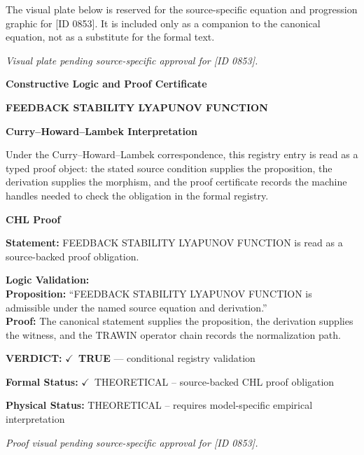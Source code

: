 \begingroup\footnotesize\sloppy
The visual plate below is reserved for the source-specific equation and progression graphic for [ID 0853]. It is included only as a companion to the canonical equation, not as a substitute for the formal text.
\par\endgroup
\begingroup\footnotesize\itshape
Visual plate pending source-specific approval for [ID 0853].
\par\endgroup

\clearpage
\begingroup\tzpsupportsetup
\noindent\textbf{\fontsize{10.8pt}{12.8pt}\selectfont [ID 0853] Constructive Logic and Proof Certificate}\par
\noindent\textbf{\fontsize{10pt}{12pt}\selectfont FEEDBACK STABILITY LYAPUNOV FUNCTION}\par
\vspace{0.45em}
\begingroup
\footnotesize
\setlength{\parskip}{0.22em}
\setlength{\parindent}{0pt}
\noindent\textbf{Curry--Howard--Lambek Interpretation}\par
Under the Curry--Howard--Lambek correspondence, this registry entry is read as a typed proof
object: the stated source condition supplies the proposition, the derivation supplies the
morphism, and the proof certificate records the machine handles needed to check the obligation
in the formal registry.

\vspace{0.45em}
\noindent\textbf{CHL Proof}\par
\textbf{Statement:} FEEDBACK STABILITY LYAPUNOV FUNCTION is read as a source-backed proof obligation.

\textbf{Logic Validation:}\\
\textbf{Proposition:} ``FEEDBACK STABILITY LYAPUNOV FUNCTION is admissible under the named source equation and derivation.''\\
\textbf{Proof:} The canonical statement supplies the proposition, the derivation supplies the witness, and the TRAWIN operator chain records the normalization path.

\textbf{VERDICT:} \ensuremath{\checkmark}\ \textbf{TRUE} --- conditional registry validation

\textbf{Formal Status:} \ensuremath{\checkmark}\ THEORETICAL -- source-backed CHL proof obligation

\textbf{Physical Status:} THEORETICAL -- requires model-specific empirical interpretation
\par\vspace{0.45em}
\par
\vfill
\begingroup\footnotesize\itshape
Proof visual pending source-specific approval for [ID 0853].
\par\endgroup
\vfill
\endgroup
\endgroup
